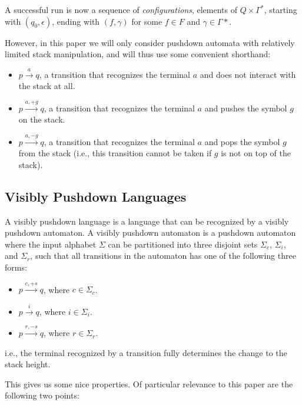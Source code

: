 \documentclass[acmsmall,review,anonymous]{acmart}\settopmatter{printfolios=true,printccs=false,printacmref=false}
\begin{document}
\noindent A successful run is now a sequence of \emph{configurations}, elements of $Q \times \Gamma^{*}$, starting with $(q_0, \epsilon)$, ending with $(f, \gamma)$ for some $f \in F$ and $\gamma \in \Gamma*$.

However, in this paper we will only consider pushdown automata with relatively limited stack manipulation, and will thus use some convenient shorthand:

\begin{itemize}
\item $p \xrightarrow{a} q$, a transition that recognizes the terminal $a$ and does not interact with the stack at all.
\item $p \xrightarrow{a, +g} q$, a transition that recognizes the terminal $a$ and pushes the symbol $g$ on the stack.
\item $p \xrightarrow{a, -g} q$, a transition that recognizes the terminal $a$ and pops the symbol $g$ from the stack (i.e., this transition cannot be taken if $g$ is not on top of the stack).
\end{itemize}

\subsection{Visibly Pushdown Languages}

A visibly pushdown language \cite{alurVisiblyPushdownLanguages2004} is a language that can be recognized by a visibly pushdown automaton. A visibly pushdown automaton is a pushdown automaton where the input alphabet $\Sigma$ can be partitioned into three disjoint sets $\Sigma_c$, $\Sigma_i$, and $\Sigma_r$, such that all transitions in the automaton has one of the following three forms:

\begin{itemize}
\item $p \xrightarrow{c, +s} q$, where $c \in \Sigma_c$.
\item $p \xrightarrow{i} q$, where $i \in \Sigma_i$.
\item $p \xrightarrow{r, -s} q$, where $r \in \Sigma_r$.
\end{itemize}

\noindent i.e., the terminal recognized by a transition fully determines the change to the stack height.

This gives us some nice properties. Of particular relevance to this paper are the following two points:
\end{document}

